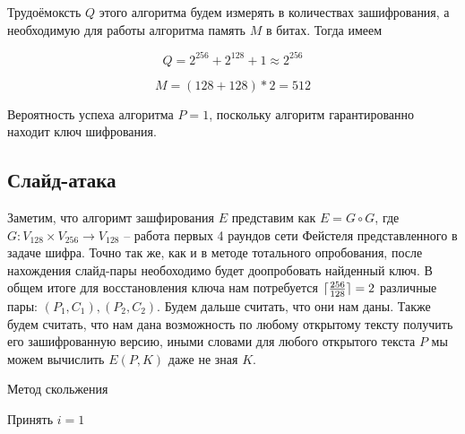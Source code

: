\documentclass[a4paper,12pt]{article}
\DeclarePairedDelimiter{\ceil}{\lceil}{\rceil}
\begin{document}
	Трудоёмоксть $Q$ этого алгоритма будем измерять в количествах зашифрования, а необходимую для работы алгоритма память $M$ в битах. Тогда имеем
	
	\[ Q = 2^{256} + 2^{128} + 1 \approx 2^{256} \]
	
	\[ M = (128+128)*2 = 512 \]	
	
	Вероятность успеха алгоритма $P = 1$, поскольку алгоритм гарантированно находит ключ шифрования.

	\subsection*{Слайд-атака}
	
	Заметим, что алгоримт зашфирования $E$ представим как $E=G \circ G$, где $G: V_{128} \times V_{256} \rightarrow V_{128}$ -- работа первых 4 раундов сети Фейстеля представленного в задаче шифра. Точно так же, как и в методе тотального опробования, после нахождения слайд-пары необоходимо будет доопробовать найденный ключ. В общем итоге для восстановления ключа нам потребуется $\ceil{\frac{256}{128}} = 2$ различные пары: $(P_1, C_1), (P_2, C_2)$. Будем дальше считать, что они нам даны. Также будем считать, что нам дана возможность по любому открытому тексту получить его зашифрованную версию, иными словами для любого открытого текста $P$ мы можем вычислить $E(P, K)$ даже не зная $K$.
	
		\begin{algorithm}[H]
		
		\caption{Метод скольжения}
		\label{alg:Slide}
		\SetAlgoNoEnd \SetAlgoNoLine 
		
		
		Принять $i=1$
		
	\end{algorithm}	
\end{document}
